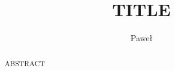 \documentclass[cameraready]{Interspeech}
\title{TITLE}
\author[affiliation={1}]{Paweł}{Pozorski}
\begin{document}
\maketitle

\begin{abstract}
ABSTRACT
\end{abstract}
\end{document}

